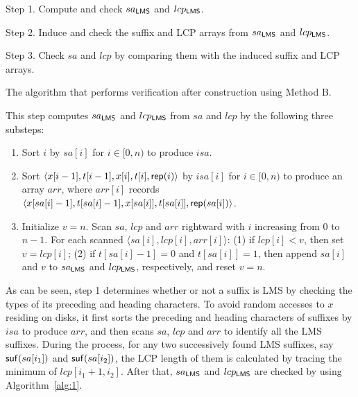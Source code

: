 \documentclass[10pt,journal,compsoc]{IEEEtran}
\begin{document}
	\begin{algorithm}
		
		\SetAlgoNoLine
		
		
		Step 1. Compute and check $sa_{\sf LMS}$ and $lcp_{\sf LMS}$.
		
		Step 2. Induce and check the suffix and LCP arrays from $sa_{\sf LMS}$ and $lcp_{\sf LMS}$.
		
		Step 3. Check $sa$ and $lcp$ by comparing them with the induced suffix and LCP arrays.
		
		\caption{The algorithm that performs verification after construction using Method B.}
		
		\label{alg:3}
		
	\end{algorithm}
	
	\vspace{1ex}  This step computes $sa_{\sf LMS}$ and $lcp_{\sf LMS}$ from $sa$ and $lcp$ by the following three substeps:
	
	\begin{enumerate}
		\item [(1a)]
		Sort $i$ by $sa[i]$ for $i \in [0, n)$ to produce $isa$.
		
		\item [(1b)]
		Sort $\langle x[i - 1], t[i - 1], x[i], t[i], {\sf rep}(i) \rangle$ by $isa[i]$ for $i \in [0, n)$ to produce an array $arr$, where $arr[i]$ records $\langle x[sa[i] - 1], t[sa[i] - 1], x[sa[i]], t[sa[i]], {\sf rep}(sa[i]) \rangle$.
		
		\item [(1c)]
		Initialize $v=n$. Scan $sa$, $lcp$ and $arr$ rightward with $i$ increasing from $0$ to $n - 1$. For each scanned $\langle sa[i], lcp[i], arr[i] \rangle$: (1) if $lcp[i] < v$, then set $v = lcp[i]$; (2) if $t[sa[i] - 1] = 0$ and $t[sa[i]] = 1$, then append $sa[i]$ and $v$ to $sa_{\sf LMS}$ and $lcp_{\sf LMS}$, respectively, and reset $v = n$.
		
	\end{enumerate}
	
	As can be seen, step 1 determines whether or not a suffix is LMS by checking the types of its preceding and heading characters. To avoid random accesses to $x$ residing on disks, it first sorts the preceding and heading characters of suffixes by $isa$ to produce $arr$, and then scans $sa$, $lcp$ and $arr$ to identify all the LMS suffixes. During the process, for any two successively found LMS suffixes, say ${\sf suf}(sa[i_1])$ and ${\sf suf}(sa[i_2])$, the LCP length of them is calculated by tracing the minimum of $lcp[i_1 + 1, i_2]$. After that, $sa_{\sf LMS}$ and $lcp_{\sf LMS}$ are checked by using Algorithm~\ref{alg:1}.
	
\end{document}

